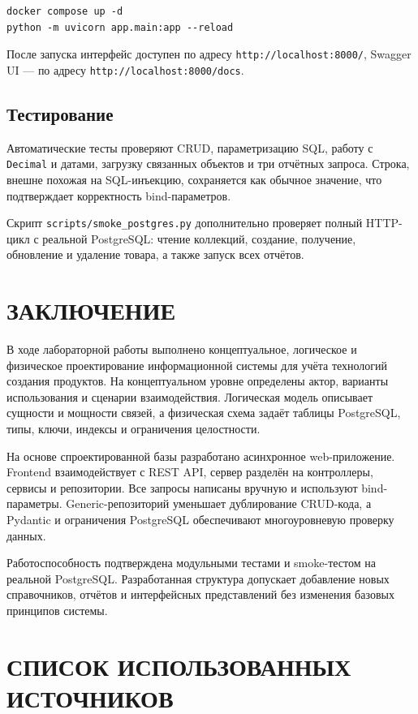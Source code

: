 \documentclass[14pt,a4paper]{extarticle}
\begin{document}
\begin{verbatim}
docker compose up -d
python -m uvicorn app.main:app --reload
\end{verbatim}

После запуска интерфейс доступен по адресу
\texttt{http://localhost:8000/}, Swagger UI --- по адресу
\texttt{http://localhost:8000/docs}.

\subsection{Тестирование}

Автоматические тесты проверяют CRUD, параметризацию SQL, работу с
\texttt{Decimal} и датами, загрузку связанных объектов и три отчётных запроса.
Строка, внешне похожая на SQL-инъекцию, сохраняется как обычное значение, что
подтверждает корректность bind-параметров.

Скрипт \texttt{scripts/smoke\_postgres.py} дополнительно проверяет полный
HTTP-цикл с реальной PostgreSQL: чтение коллекций, создание, получение,
обновление и удаление товара, а также запуск всех отчётов.

\clearpage
\section*{ЗАКЛЮЧЕНИЕ}

В ходе лабораторной работы выполнено концептуальное, логическое и физическое
проектирование информационной системы для учёта технологий создания
продуктов. На концептуальном уровне определены актор, варианты использования
и сценарии взаимодействия. Логическая модель описывает сущности и мощности
связей, а физическая схема задаёт таблицы PostgreSQL, типы, ключи, индексы и
ограничения целостности.

На основе спроектированной базы разработано асинхронное web-приложение.
Frontend взаимодействует с REST API, сервер разделён на контроллеры, сервисы и
репозитории. Все запросы написаны вручную и используют bind-параметры.
Generic-репозиторий уменьшает дублирование CRUD-кода, а Pydantic и ограничения
PostgreSQL обеспечивают многоуровневую проверку данных.

Работоспособность подтверждена модульными тестами и smoke-тестом на реальной
PostgreSQL. Разработанная структура допускает добавление новых справочников,
отчётов и интерфейсных представлений без изменения базовых принципов системы.

\clearpage
\section*{СПИСОК ИСПОЛЬЗОВАННЫХ ИСТОЧНИКОВ}
\end{document}
